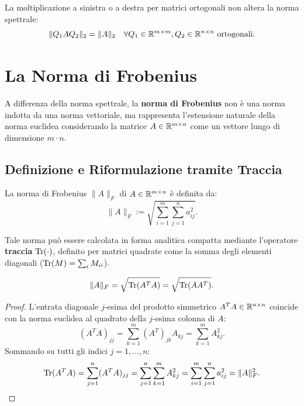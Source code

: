 \begin{corollary}
La moltiplicazione a sinistra o a destra per matrici ortogonali non altera la norma spettrale:
\begin{equation}
    \|Q_1 A Q_2\|_2 = \|A\|_2 \quad \forall Q_1 \in \mathbb{R}^{m \times m}, Q_2 \in \mathbb{R}^{n \times n} \text{ ortogonali}.
\end{equation}
\end{corollary}

\FloatBarrier
\section{La Norma di Frobenius}
\label{sec:norma-frobenius}

A differenza della norma spettrale, la \textbf{norma di Frobenius} non \`e una norma indotta da una norma vettoriale, ma rappresenta l'estensione naturale della norma euclidea considerando la matrice $A \in \mathbb{R}^{m \times n}$ come un vettore lungo di dimensione $m \cdot n$.

\subsection{Definizione e Riformulazione tramite Traccia}

\begin{definition}
La norma di Frobenius $\|A\|_F$ di $A \in \mathbb{R}^{m \times n}$ \`e definita da:
\begin{equation}
    \|A\|_F := \sqrt{\sum_{i=1}^m \sum_{j=1}^n a_{ij}^2}.
\end{equation}
\end{definition}

Tale norma pu\`o essere calcolata in forma analitica compatta mediante l'operatore \textbf{traccia} $\operatorname{Tr}(\cdot)$, definito per matrici quadrate come la somma degli elementi diagonali ($\operatorname{Tr}(M) = \sum_i M_{ii}$).

\begin{proposition}
\begin{equation}
    \|A\|_F = \sqrt{\operatorname{Tr}(A^T A)} = \sqrt{\operatorname{Tr}(A A^T)}.
\end{equation}
\end{proposition}

\begin{proof}
L'entrata diagonale $j$-esima del prodotto simmetrico $A^T A \in \mathbb{R}^{n \times n}$ coincide con la norma euclidea al quadrato della $j$-esima colonna di $A$:
\begin{equation}
    (A^T A)_{jj} = \sum_{k=1}^m (A^T)_{jk} A_{kj} = \sum_{k=1}^m A_{kj}^2.
\end{equation}
Sommando su tutti gli indici $j=1, \dots, n$:
\begin{equation}
    \operatorname{Tr}(A^T A) = \sum_{j=1}^n (A^T A)_{jj} = \sum_{j=1}^n \sum_{k=1}^m A_{kj}^2 = \sum_{i=1}^m \sum_{j=1}^n a_{ij}^2 = \|A\|_F^2.
\end{equation}
\end{proof}

